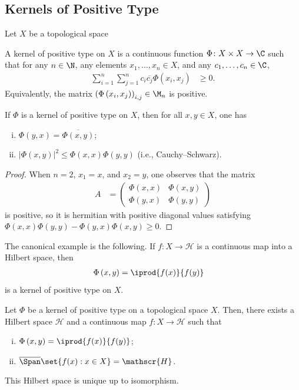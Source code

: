 \documentclass[10pt]{mypackage}
\begin{document}
\subsection{Kernels of Positive Type}%
Let $X$ be a topological space
\begin{definition}
  A kernel of positive type on $X$ is a continuous function $\Phi\colon X\times X\to \C$ such that for any $n\in \N$, any elements $x_1,\dots,x_n\in X$, and any $c_1,\dots,c_n\in \C$,
  \begin{align*}
    \sum_{i=1}^{n} \sum_{j=1}^{n} c_i \overline{c_j}\Phi\left( x_i,x_j \right) &\geq 0.
  \end{align*}
  Equivalently, the matrix $\left( \Phi\left( x_i,x_j \right) \right)_{i,j}\in \M_n$ is positive.
\end{definition}
\begin{proposition}
  If $\Phi$ is a kernel of positive type on $X$, then for all $x,y\in X$, one has
  \begin{enumerate}[(i)]
    \item $\Phi\left( y,x \right) = \overline{\Phi\left( x,y \right)}$;
    \item $\left\vert \Phi\left( x,y \right) \right\vert^2 \leq \Phi\left( x,x \right)\Phi\left( y,y \right)$ (i.e., Cauchy--Schwarz).
  \end{enumerate}
\end{proposition}
\begin{proof}
  When $n=2$, $x_1 = x$, and $x_2 = y$, one observes that the matrix
  \begin{align*}
    A &= \begin{pmatrix}\Phi\left( x,x \right) & \Phi\left( x,y \right) \\ \Phi\left( y,x \right) & \Phi\left( y,y \right)\end{pmatrix}
  \end{align*}
  is positive, so it is hermitian with positive diagonal values satisfying $\Phi\left( x,x \right)\Phi\left( y,y \right) - \Phi\left( y,x \right)\Phi\left( x,y \right) \geq 0$.
\end{proof}
The canonical example is the following. If $f\colon X\to \mathscr{H}$ is a continuous map into a Hilbert space, then
\begin{align*}
  \Phi\left( x,y \right) &= \iprod{f(x)}{f(y)}
\end{align*}
is a kernel of positive type on $X$.
\begin{theorem}
  Let $\Phi$ be a kernel of positive type on a topological space $X$. Then, there exists a Hilbert space $\mathscr{H}$ and a continuous map $f\colon X\to \mathscr{H}$ such that
  \begin{enumerate}[(i)]
    \item $\Phi\left( x,y \right) = \iprod{f(x)}{f(y)}$;
    \item $ \overline{\Span}\set{f(x) : x\in X} = \mathscr{H} $.
  \end{enumerate}
  This Hilbert space is unique up to isomorphism.
\end{theorem}
\end{document}
